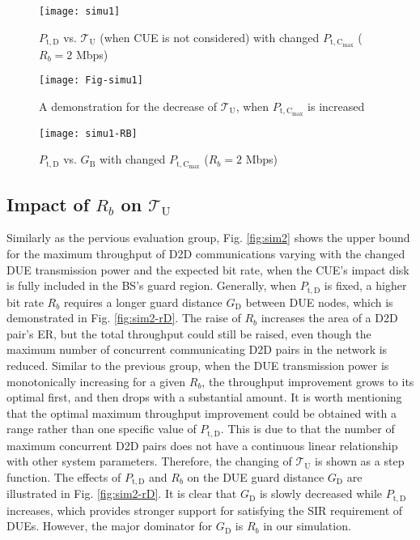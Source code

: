 \documentclass[journal, 10pt]{IEEEtran}
\begin{document}
\begin{figure}[!htb]
\centering 
\texttt{[image: simu1]} 
\caption{$P_\mathrm{t,D}$ vs. $\mathcal{T}_\mathrm{U}$ 
(when CUE is not considered) with changed $P_\mathrm{t,C_{max} }$ 
($R_b =2$ Mbps) }\label{fig:simu1} 
\end{figure}
\begin{figure}[!htb]
\centering \texttt{[image: Fig-simu1]} \caption{A demonstration for the decrease of  $\mathcal{T}_\mathrm{U}$, 
when $P_\mathrm{t,C_{max}}$ is increased}\label{fig:simu1-ex} 
\end{figure}
\begin{figure}[!htb]
\centering \texttt{[image: simu1-RB]} \caption{$P_\mathrm{t,D}$ vs. $G_\mathrm{B}$ with changed 
$P_\mathrm{t,C_{max} }$ ($R_b =2$ Mbps)} \label{fig:simu1b} 
\end{figure}


\subsection{Impact of $R_b$ on $\mathcal{T}_\mathrm{U}$}
Similarly as the pervious evaluation group, Fig. \ref{fig:sim2} shows
the upper bound for the maximum throughput of D2D communications
varying with the changed DUE transmission power and the expected bit
rate, when the CUE's impact disk is fully included in the BS's guard
region. Generally, when $P_\mathrm{t,D}$ is fixed, a higher bit rate
$R_b$ requires a longer guard distance $G_\mathrm{D}$ between DUE nodes,
which is demonstrated in Fig. \ref{fig:sim2-rD}. The raise of $R_b$
increases the area of a D2D pair's ER, but the total throughput could
still be raised, even though the maximum number of concurrent
communicating D2D pairs in the network is reduced. Similar to the
previous group, when the DUE transmission power is monotonically
increasing for a given $R_b$, the throughput improvement grows to its
optimal first, and then drops with a substantial amount. It is worth
mentioning that the optimal maximum throughput improvement could be
obtained with a range rather than one specific value of
$P_\mathrm{t,D}$. This is due to that the number of maximum concurrent
D2D pairs does not have a continuous linear relationship with other
system parameters. Therefore, the changing of $\mathcal{T}_\mathrm{U}$
is shown as a step function. The effects of
$P_\mathrm{t,D}$ and $R_b$ on the DUE guard distance $G_\mathrm{D}$
are illustrated in Fig. \ref{fig:sim2-rD}. It is clear that
$G_\mathrm{D}$ is slowly decreased while $P_\mathrm{t,D}$ increases,
which provides stronger support for satisfying the SIR requirement of
DUEs. However, the major dominator for $G_\mathrm{D}$ is $R_b$ in our
simulation. 
\end{document}
